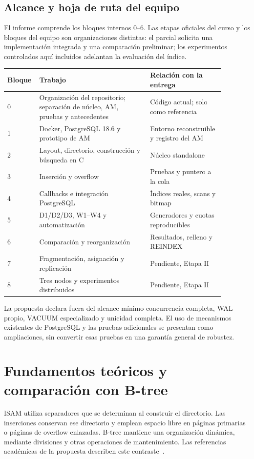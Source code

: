 \documentclass[11pt,a4paper]{article}
\newcommand{\code}[1]{\texttt{\detokenize{#1}}}
\begin{document}
\subsection{Alcance y hoja de ruta del equipo}
El informe comprende los bloques internos 0--6. Las etapas oficiales del curso
y los bloques del equipo son organizaciones distintas: el parcial solicita una
implementación integrada y una comparación preliminar; los experimentos
controlados aquí incluidos adelantan la evaluación del índice.

\begin{longtable}{p{0.08\linewidth}p{0.48\linewidth}p{0.32\linewidth}}
\toprule Bloque & Trabajo & Relación con la entrega\\\midrule
0 & Organización del repositorio; separación de núcleo, AM, pruebas y antecedentes & Código actual; \code{legacy/} solo como referencia\\
1 & Docker, PostgreSQL 18.6 y prototipo de AM & Entorno reconstruible y registro del AM\\
2 & Layout, directorio, construcción y búsqueda en C & Núcleo standalone\\
3 & Inserción y overflow & Pruebas y puntero a la cola\\
4 & Callbacks e integración PostgreSQL & Índices reales, scans y bitmap\\
5 & D1/D2/D3, W1--W4 y automatización & Generadores y cuotas reproducibles\\
6 & Comparación y reorganización & Resultados, relleno y REINDEX\\
7 & Fragmentación, asignación y replicación & Pendiente, Etapa II\\
8 & Tres nodos y experimentos distribuidos & Pendiente, Etapa II\\\bottomrule
\end{longtable}

La propuesta declara fuera del alcance mínimo concurrencia completa, WAL propio,
VACUUM especializado y unicidad completa. El uso de mecanismos existentes de
PostgreSQL y las pruebas adicionales se presentan como ampliaciones, sin convertir
esas pruebas en una garantía general de robustez.

\section{Fundamentos teóricos y comparación con B-tree}
ISAM utiliza separadores que se determinan al construir el directorio. Las
inserciones conservan ese directorio y emplean espacio libre en páginas primarias
o páginas de overflow enlazadas. B-tree mantiene una organización dinámica,
mediante divisiones y otras operaciones de mantenimiento. Las referencias
académicas de la propuesta describen este contraste~\cite{ramakrishnan,silberschatz}.
\end{document}
